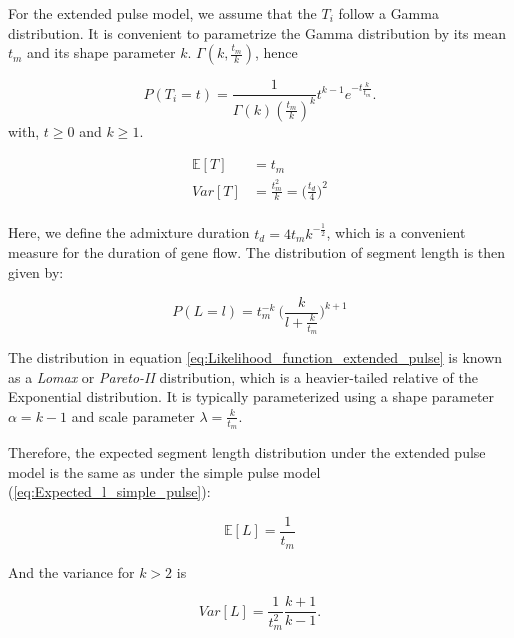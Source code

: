 \documentclass[]{article}
\begin{document}
For the extended pulse model, we assume that the $T_i$ follow a Gamma distribution. It is convenient to parametrize the Gamma distribution by its mean $t_m$ and its shape parameter $k$.  $\Gamma(k,\frac{t_m}{k})$, hence


\begin{equation}
\label{eq:RV_extended_pulse}
  P(T_i=t)=\frac{1}{\Gamma(k)(\frac{t_m}{k})^k}t^{k-1}e^{-t\frac{k}{t_m}}.
\end{equation} 
with, $t \geq 0$ and $k \geq 1$.

\begin{equation}
\begin{split}
\label{eq:RV_extended_pulse_properties}
\mathbb{E}[T]&=t_{m} \\
Var[T]&=\frac{t_{m}^2}{k} = \bigg(\frac{t_d}{4} \bigg)^2  \\
\end{split}
\end{equation}

Here, we define the admixture duration $t_d=4t_m k^{-\frac{1}{2}} $, which is a convenient measure for the duration of gene flow. The distribution of segment length is then given by:


\begin{equation}
\label{eq:Likelihood_function_extended_pulse}
    P(L=l) = t_{m}^{-k} \ \Bigg( \frac{k}{l+\frac{k}{t_{m}}}\Bigg)^{k+1}
\end{equation}

The distribution  in equation \ref{eq:Likelihood_function_extended_pulse} is known as a \emph{Lomax} or \emph{Pareto-II} distribution, which is a heavier-tailed relative of the Exponential distribution. It is typically parameterized using a shape parameter $\alpha=k-1$ and scale parameter $\lambda = \frac{k}{t_m}$. 


Therefore, the expected segment length distribution under the extended pulse model is the same as under the simple pulse model (\ref{eq:Expected_l_simple_pulse}):

\begin{equation}
\label{eq:Expected_l_extended_pulse}
\mathbb{E}[L] = \frac{1}{t_{m}}
\end{equation}

And the variance for $k>2$ is 

\begin{equation}
\label{eq:Var_l_extended_pulse}
Var[L] = \frac{1}{t_m^2}\frac{k+1}{k-1}\text{.}
\end{equation}
\end{document}
